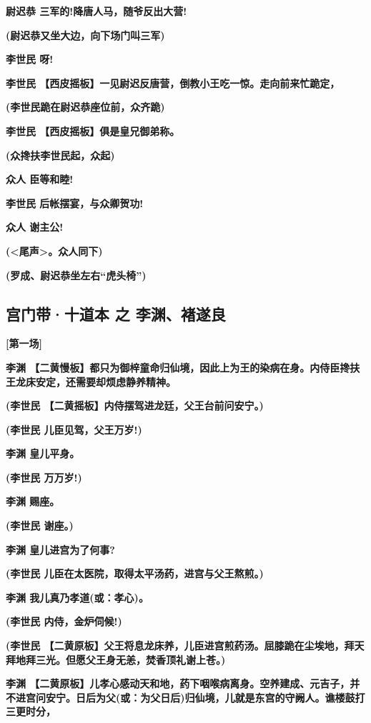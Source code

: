 \textbf{尉迟恭 三军的!降唐人马，随爷反出大营!}

\textbf{(尉迟恭又坐大边，向下场门叫三军)}

\textbf{李世民 呀!}

\textbf{李世民
【西皮摇板】一见尉迟反唐营，倒教小王吃一惊。走向前来忙跪定，}

\textbf{(李世民跪在尉迟恭座位前，众齐跪)}

\textbf{李世民 【西皮摇板】俱是皇兄御弟称。}

\textbf{(众搀扶李世民起，众起)}

\textbf{众人 臣等和睦!}

\textbf{李世民 后帐摆宴，与众卿贺功!}

\textbf{众人 谢主公!}

\textbf{(\textless{}尾声\textgreater{}。众人同下)}

\textbf{(罗成、尉迟恭坐左右``虎头椅'')}

\newpage
\hypertarget{ux5babux95e8ux5e26ux5341ux9053ux672c-ux4e4b-ux674eux6e0aux891aux9042ux826f}{%
\subsection{宫门带·十道本 之
李渊、褚遂良}\label{ux5babux95e8ux5e26ux5341ux9053ux672c-ux4e4b-ux674eux6e0aux891aux9042ux826f}}

\textbf{{[}第一场{]}}

\textbf{李渊
【二黄慢板】都只为御梓童命归仙境，因此上为王的染病在身。内侍臣搀扶王龙床安定，还需要却烦虑静养精神。}

\textbf{(李世民 【二黄摇板】内侍摆驾进龙廷，父王台前问安宁。)}

\textbf{(李世民 儿臣见驾，父王万岁!)}

\textbf{李渊 皇儿平身。}

\textbf{(李世民 万万岁!)}

\textbf{李渊 赐座。}

\textbf{(李世民 谢座。)}

\textbf{李渊 皇儿进宫为了何事?}

\textbf{(李世民 儿臣在太医院，取得太平汤药，进宫与父王熬煎。)}

\textbf{李渊 我儿真乃孝道(或：孝心)。}

\textbf{(李世民 内侍，金炉伺候!)}

\textbf{(李世民
【二黄原板】父王将息龙床养，儿臣进宫煎药汤。屈膝跪在尘埃地，拜天拜地拜三光。但愿父王身无恙，焚香顶礼谢上苍。)}

\textbf{李渊
【二黄原板】儿孝心感动天和地，药下咽喉病离身。空养建成、元吉子，并不进宫问安宁。日后为父(或：为父日后)归仙境，儿就是东宫的守阙人。谯楼鼓打三更时分，}

